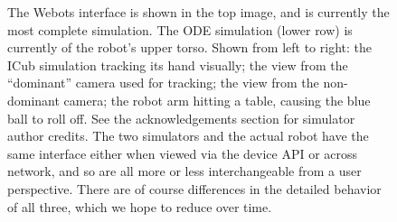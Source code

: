 \begin{figure}[tbp]
{The Webots interface is shown in the top image, and is currently
the most complete simulation.  The ODE simulation (lower row)
is currently of the robot's upper torso.  Shown from left to
right: the ICub simulation tracking its hand visually;
the view from the ``dominant'' camera used for tracking; the
view from the non-dominant camera; the robot arm hitting
a table, causing the blue ball to roll off.
%
See the acknowledgements section for simulator author credits.
%
The two simulators and the actual robot have the same interface either
when viewed via the device API or across network, and so
are all more or less interchangeable from a user perspective.
%
%
There are of course
differences in the detailed behavior of all three, which we hope to
reduce over time.
%
} 
\label{fig:simulators}
\end{figure}

